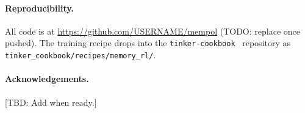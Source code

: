\documentclass[11pt]{article}
\newcommand{\TBD}[1]{%
  \textcolor{red!80!black}{\textsf{[TBD: #1]}}}
\begin{document}
\paragraph{Reproducibility.} All code is at
\url{https://github.com/USERNAME/mempol} (TODO: replace once pushed).
The training recipe drops into the
\texttt{tinker-cookbook}~\cite{tinker2025} repository as
\texttt{tinker\_cookbook/recipes/memory\_rl/}.

\paragraph{Acknowledgements.} \TBD{Add when ready.}



\end{document}
